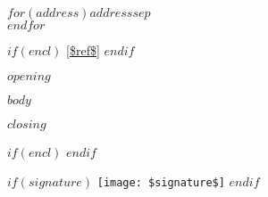 \documentclass[11pt]{lettre}
\makeatletter
\newcommand*{\NoRule}{\renewcommand*{\rule@length}{0}}
\makeatother
\begin{document}
%
\begin{letter}{
$for(address)$$address$$sep$\\$endfor$}
\date{$date$} 
\NoRule
\vspace{-100px}
%

$if(encl)$
\vref{$ref$} 
$endif$

\opening{$opening$}

$body$
\closing{$closing$}

$if(encl)$
$endif$

\begin{flushright}
$if(signature)$
\texttt{[image: \$signature\$]}
$endif$
\end{flushright}


\end{letter}
\end{document}
